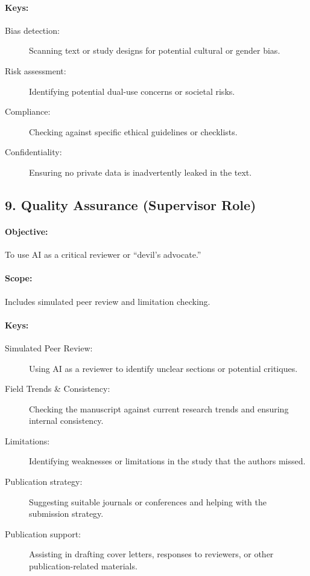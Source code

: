\documentclass[11pt]{article}
\begin{document}
\paragraph{Keys:}
\begin{description}
    \item[Bias detection:] Scanning text or study designs for potential cultural or gender bias.
    \item[Risk assessment:] Identifying potential dual-use concerns or societal risks.
    \item[Compliance:] Checking against specific ethical guidelines or checklists.
    \item[Confidentiality:] Ensuring no private data is inadvertently leaked in the text.
\end{description}

\subsection*{9. Quality Assurance (Supervisor Role)}
\paragraph{Objective:} To use AI as a critical reviewer or “devil's advocate.”
\paragraph{Scope:} Includes simulated peer review and limitation checking.
\paragraph{Keys:}
\begin{description}
    \item[Simulated Peer Review:] Using AI as a reviewer to identify unclear sections or potential critiques.
    \item[Field Trends \& Consistency:] Checking the manuscript against current research trends and ensuring internal consistency.
    \item[Limitations:] Identifying weaknesses or limitations in the study that the authors missed.
    \item[Publication strategy:] Suggesting suitable journals or conferences and helping with the submission strategy.
    \item[Publication support:] Assisting in drafting cover letters, responses to reviewers, or other publication-related materials.
\end{description}
\end{document}
